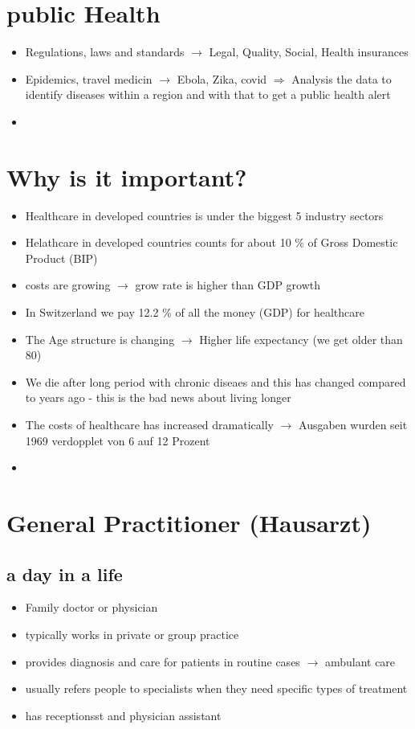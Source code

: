 \documentclass{report}
\theoremstyle{definition}
\theoremstyle{example}
\begin{document}
\section{public Health}
\begin{itemize}
   \item Regulations, laws and standards $\rightarrow$ Legal, Quality, Social, Health insurances
   \item Epidemics, travel medicin $\rightarrow$ Ebola, Zika, covid $\Rightarrow$ Analysis the data to identify diseases within a region and with that to get a public health alert
   \item 
\end{itemize}

\section*{Why is it important?}
\begin{itemize}
   \item Healthcare in developed countries is under the biggest 5 industry sectors
   \item Helathcare in developed countries counts for about 10 \% of Gross Domestic Product (BIP)
   \item costs are growing $\rightarrow$ grow rate is higher than GDP growth
   \item In Switzerland we pay 12.2 \% of all the money (GDP) for healthcare
   \item The Age structure is changing $\rightarrow$ Higher life expectancy (we get older than 80)
   \item We die after long period with chronic diseaes and this has changed compared to years ago - this is the bad news about living longer
   \item The costs of healthcare has increased dramatically $\rightarrow$ Ausgaben wurden seit 1969 verdopplet von 6 auf 12 Prozent
   \item 
\end{itemize}

\section{General Practitioner (Hausarzt)}
   \subsection{a day in a life}
   \begin{itemize}
      \item Family doctor or physician
      \item typically works in private or group practice
      \item provides diagnosis and care for patients in routine cases $\rightarrow$ ambulant care
      \item usually refers people to specialists when they need specific types of treatment
      \item has receptionsst and physician assistant
   \end{itemize}
\end{document}
